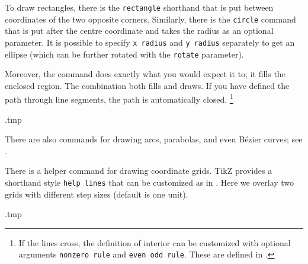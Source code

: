 To draw rectangles, there is the \verb|rectangle| shorthand
that is put between coordinates of the two opposite corners.
Similarly, there is the \verb|circle| command that is put after the centre coordinate
and takes the radius as an optional parameter.
It is possible to specify \verb|x radius| and \verb|y radius| separately to get an ellipse
(which can be further rotated with the \verb|rotate| parameter).

Moreover, the command  does exactly what you would expect it to;
it fills the enclosed region.
The combination  both fills and draws.
If you have defined the path through line segments,
the path is automatically closed.%
\footnote{If the lines cross, the definition of interior can be customized with optional arguments
\texttt{nonzero rule} and \texttt{even odd rule}.
These are defined in \cite[Section~15.5.2]{tikz}.}
%
\begin{VerbatimOut}{\jobname.tmp}
\centering
{}
\end{VerbatimOut}
\ShowExampleBelow[2]

There are also commands for drawing arcs, parabolas, and even Bézier curves;
see \cite[Section~14]{tikz}.

There is a helper command for drawing coordinate grids.
TikZ provides a shorthand style \verb|help lines|
that can be customized as in .
Here we overlay two grids with different step sizes (default is one unit).
%
\begin{VerbatimOut}{\jobname.tmp}
\centering
{}
\end{VerbatimOut}
\ShowExampleBelow[2]

